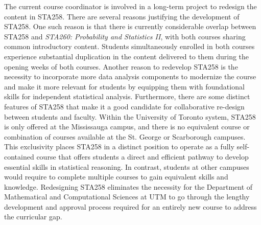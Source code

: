 \documentclass[11pt]{article}
\begin{document}
The current course coordinator is involved in a long-term project to redesign the content in STA258. 
There are several reasons justifying the development of STA258.
One such reason is that there is currently considerable overlap between STA258 and \textit{STA260: Probability and Statistics II}, with both courses sharing common introductory content.
Students simultaneously enrolled in both courses experience substantial duplication in the content delivered to them during the opening weeks of both courses.
Another reason to redevelop STA258 is the necessity to incorporate more data analysis components to modernize the course and make it more relevant for students by equipping them with foundational skills for independent statistical analysis.
Furthermore, there are some distinct features of STA258 that make it a good candidate for collaborative re-design between students and faculty.
Within the University of Toronto system, STA258 is only offered at the Mississauga campus, and there is no equivalent course or combination of courses available at the St. George or Scarborough campuses.
This exclusivity places STA258 in a distinct position to operate as a fully self-contained course that offers students a direct and efficient pathway to develop essential skills in statistical reasoning. In contrast, students at other campuses would require to complete multiple courses to gain equivalent skills and knowledge.
Redesigning STA258 eliminates the necessity for the Department of Mathematical and Computational Sciences at UTM to go through the lengthy development and approval process required for an entirely new course to address the curricular gap.
\end{document}
